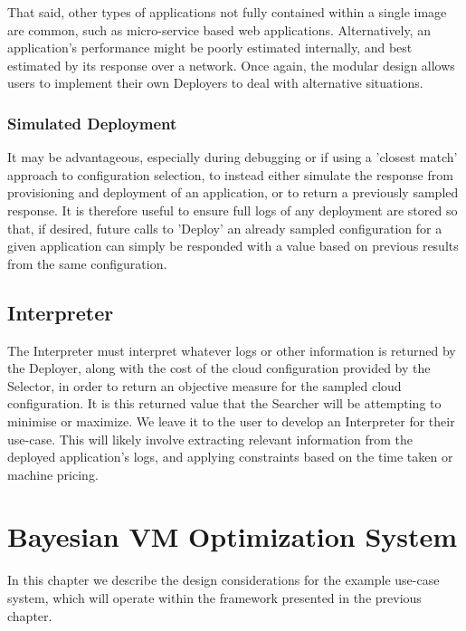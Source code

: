 \documentclass{report}
\begin{document}
That said, other types of applications not fully contained within a single image are common, such as micro-service based web applications. Alternatively, an application's performance might be poorly estimated internally, and best estimated by its response over a network. Once again, the modular design allows users to implement their own Deployers to deal with alternative situations.

\subsection{Simulated Deployment}
It may be advantageous, especially during debugging or if using a 'closest match' approach to configuration selection, to instead either simulate the response from provisioning and deployment of an application, or to return a previously sampled response. It is therefore useful to ensure full logs of any deployment are stored so that, if desired, future calls to 'Deploy' an already sampled configuration for a given application can simply be responded with a value based on previous results from the same configuration.

\section{Interpreter}
The Interpreter must interpret whatever logs or other information is returned by the Deployer, along with the cost of the cloud configuration provided by the Selector, in order to return an objective measure for the sampled cloud configuration. It is this returned value that the Searcher will be attempting to minimise or maximize. We leave it to the user to develop an Interpreter for their use-case. This will likely involve extracting relevant information from the deployed application's logs, and applying constraints based on the time taken or machine pricing. 

\chapter{Bayesian VM Optimization System}
In this chapter we describe the design considerations for the example use-case system, which will operate within the framework presented in the previous chapter.
\end{document}
